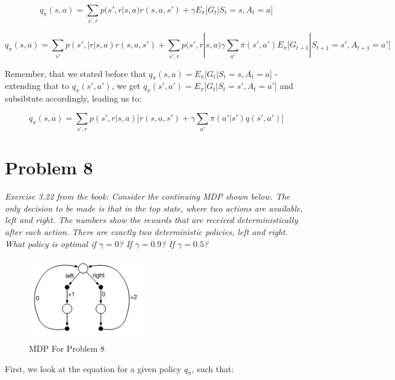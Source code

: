 \documentclass{article}
\begin{document}
\begin{equation}
    q_\pi(s,a) = \sum_{s',r} p(s',r|s,a) r(s,a,s') +
    \gamma E_\pi \big[ G_t | S_t=s, A_t=a \big]
\end{equation}

\begin{equation}
    q_\pi(s,a) = \sum_{s'} p(s',|r|s,a)r(s,a,s')+
    \sum_{s',r} p(s',r|s,a) \gamma \sum_{a'} \pi(s',a') E_\pi \big[
    G_{t+1}|S_{t+1}=s',A_{t+1}=a'
    \big]
\end{equation}

Remember, that we stated before that $q_\pi(s,a) = E_\pi \big[ G_t | S_t = s, A_t = a \big]$ - extending that to $q_\pi(s',a')$, we get $q_\pi(s',a') = E_\pi \big[ G_t | S_t = s', A_t = a' \big]$ and subsibtute accordingly, leading us to:

\begin{equation}
    q_\pi (s,a) = \sum_{s',r} p(s',r|s,a) \big[
        r(s,a,s')+\gamma \sum_{a'} \pi(a'|s')q(s',a')
        \big]
\end{equation}


\section*{Problem 8}

\textit{Exercise 3.22 from the book: Consider the continuing MDP shown below. The only decision to be made is that in the top state, where two actions are available, left and right. The numbers show the rewards that are received deterministically after each action. There are exactly two deterministic policies, left and right. What policy is optimal if $\gamma = 0$? If $\gamma = 0.9$? If $\gamma = 0.5$?}

\begin{figure}[H]
    \centering
    \includegraphics[width = 0.45\textwidth]{imgs/exercise_8.png}
    \caption{MDP For Problem 8}
    \label{fig:exercise8}
\end{figure}

First, we look at the equation for a given policy $q_\pi$, such that:
\end{document}
